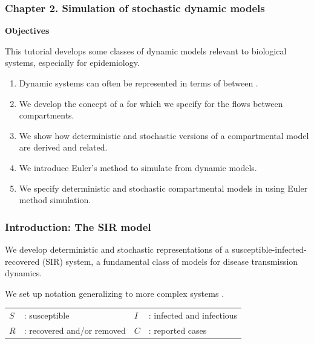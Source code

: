 \documentclass{beamer}\usepackage[]{graphicx}\usepackage[]{color}
\newcommand\CHAPTER{2}
\begin{document}








\begin{frame}[fragile]
\frametitle{Chapter \CHAPTER. Simulation of stochastic dynamic models}

\hspace{3cm} {\large \bf Objectives}

\vspace{3mm}

This tutorial develops some classes of dynamic models relevant to biological systems, especially for epidemiology.

\begin{enumerate}

\item  Dynamic systems can often be represented in terms of  between .

\item We develop the concept of a  for which we specify  for the flows between compartments.

\item We show how deterministic and stochastic versions of a compartmental model are derived and related.

\item We introduce Euler's method to simulate from dynamic models.

\item We specify deterministic and stochastic compartmental models in  using Euler method simulation.

\end{enumerate}

\end{frame}

\begin{frame}[fragile]

\frametitle{Introduction: The SIR model}

\bi
\item
We develop deterministic and stochastic representations of a susceptible-infected-recovered (SIR) system, a fundamental class of models for disease transmission dynamics.
\item
We set up  notation generalizing to more complex systems \citep{breto09}.
\ei


\vspace{5mm}

\begin{tabular}{llll}
$S$& \hspace{-2mm}:  susceptible \hspace{35mm} & $I$ &  \hspace{-2mm}: infected and infectious  \\
$R$& \hspace{-2mm}: recovered and/or removed  & $C$ &  \hspace{-2mm}: reported cases
\end{tabular}
\end{frame}
\end{document}
